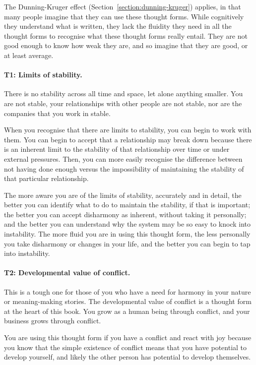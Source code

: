 The Dunning-Kruger effect  (Section~\ref{section:dunning-kruger}) applies, in that many people imagine that they can use these thought forms. While cognitively they understand what is written, they lack the fluidity they need in all the thought forms to recognise what these thought forms really entail. They are not good enough to know how weak they are, and so imagine that they are good, or at least average.
\paragraph{\textbf{T1: Limits of stability.}}
There is no stability across all time  and space, let alone anything smaller. You are not stable, your relationships with other people are not stable, nor are the companies that you work in stable.


When you recognise that there are limits to stability, you can begin to work with them. You can begin to accept that a relationship may break down because there is an inherent limit to the stability of that relationship over time or under external pressures. Then, you can more easily recognise the difference between not having done enough versus the impossibility of maintaining the stability of that particular relationship.


The more aware you are of the limits of stability, accurately and in detail, the better you can identify what to do to maintain the stability, if that is important; the better you can accept disharmony as inherent, without taking it personally; and the better you can understand why the system may be so easy to knock into instability. The more fluid you are in using this thought form, the less personally you take disharmony or changes in your life, and the better you can begin to tap into instability.


\paragraph{\textbf{T2: Developmental value of conflict.}}
This is a tough one for those of you who have a need for harmony in your nature or meaning-making stories. The developmental value of conflict  is a thought form at the heart of this book. You grow as a human being through conflict, and your business grows through conflict.


You are using this thought form if you have a conflict and react with joy because you know that the simple existence of conflict means that you have potential to develop yourself, and likely the other person has potential to develop themselves.


